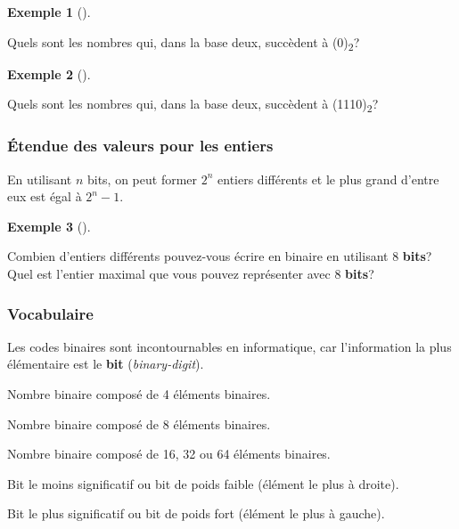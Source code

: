 \documentclass[
  letterpaper,
]{scrbook}
\providecommand{\tightlist}{%
  \setlength{\itemsep}{0pt}\setlength{\parskip}{0pt}}\usepackage{longtable,booktabs,array}
\theoremstyle{definition}
\theoremstyle{definition}
\newtheorem{example}{Exemple}[chapter]
\theoremstyle{remark}
\begin{document}
\leavevmode{}%
\begin{example}[]\label{exm-nombres-succedent-0-base-2-1}

Quels sont les nombres qui, dans la base deux, succèdent à
(0)\textsubscript{2}?

\end{example}

\leavevmode{}%
\begin{example}[]\label{exm-nombres-succedent-0-base-2-2}

Quels sont les nombres qui, dans la base deux, succèdent à
(1110)\textsubscript{2}?

\end{example}

\hypertarget{uxe9tendue-des-valeurs-pour-les-entiers}{%
\subsubsection{Étendue des valeurs pour les
entiers}\label{uxe9tendue-des-valeurs-pour-les-entiers}}

En utilisant \(n\) bits, on peut former \(2^n\) entiers différents et le
plus grand d'entre eux est égal à \(2^n-1\).

\leavevmode{}%
\begin{example}[]\label{exm-entiers-binaires}

Combien d'entiers différents pouvez-vous écrire en binaire en utilisant
8 \textbf{bits}? Quel est l'entier maximal que vous pouvez représenter
avec 8 \textbf{bits}?

\end{example}

\hypertarget{vocabulaire}{%
\subsubsection{Vocabulaire}\label{vocabulaire}}

Les codes binaires sont incontournables en informatique, car
l'information la plus élémentaire est le \textbf{bit}
(\emph{binary-digit}).

\begin{description}
\tightlist
\item[\textbf{Quartet}]
Nombre binaire composé de 4 éléments binaires.
\item[\textbf{Octet} (\emph{byte})]
Nombre binaire composé de 8 éléments binaires.
\item[\textbf{Mot}]
Nombre binaire composé de 16, 32 ou 64 éléments binaires.
\item[\textbf{LSB} (Least Significant Bit)]
Bit le moins significatif ou bit de poids faible (élément le plus à
droite).
\item[\textbf{MSB} (Most Significant Bit)]
Bit le plus significatif ou bit de poids fort (élément le plus à
gauche).
\end{description}
\end{document}
